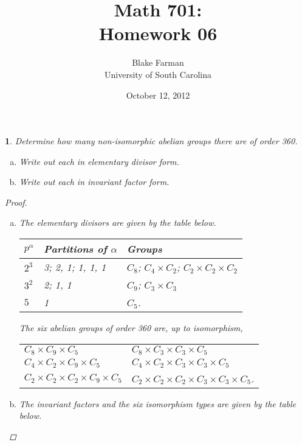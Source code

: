 \documentclass[10pt]{amsart}
\author{Blake Farman\\University of South Carolina}
\title{Math 701:\\Homework 06}
\date{October 12, 2012}
\begin{document}
\maketitle

\newtheorem{thm}{}
\newtheorem*{lem}{Lemma}

\begin{thm}
  Determine how many non-isomorphic abelian groups there are of order 360.
  \begin{enumerate}[(a)]
  \item
    Write out each in elementary divisor form.
  \item
    Write out each in invariant factor form.
  \end{enumerate}
  
  \begin{proof}
    \begin{enumerate}[(a)]
    \item
      The elementary divisors are given by the table below.\\
      \begin{center}
        \begin{tabular}{l| l | l}
          $p^\alpha$ & Partitions of $\alpha$ & Groups\\
          \hline
          $2^3$ & 3; 2, 1; 1, 1, 1 & $C_8$; $C_4 \times C_2$; $C_2 \times C_2 \times C_2$\\
          $3^2$ & 2; 1, 1 & $C_9$; $C_3 \times C_3$\\
          $5$ & 1 & $C_5$.
        \end{tabular}
      \end{center}
      The six abelian groups of order 360 are, up to isomorphism,\\
      \begin{center}
        \begin{tabular}{l l}
          $C_8 \times C_9 \times C_5$ & $C_8 \times C_3 \times C_3 \times C_5$\\
          $C_4 \times C_2 \times C_9 \times C_5$ & $C_4 \times C_2 \times C_3 \times C_3 \times C_5$\\
          $C_2 \times C_2 \times C_2 \times C_9 \times C_5$ & $C_2 \times C_2 \times C_2 \times C_3 \times C_3 \times C_5$.
        \end{tabular}
      \end{center}
    \item
      The invariant factors and the six isomorphism types are given by the table below.\\

\end{enumerate}
\end{proof}
\end{thm}
\end{document}
